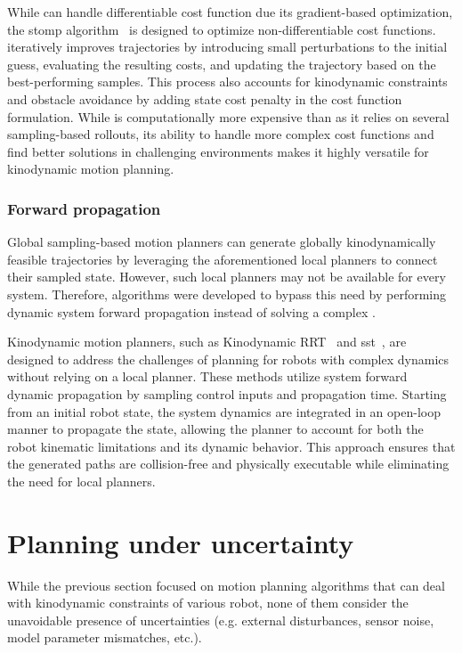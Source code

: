 While  can handle differentiable cost function due its gradient-based optimization, the \gls{stomp} algorithm~\cite{cSTOMP} is designed to optimize non-differentiable cost functions. 
 iteratively improves trajectories by introducing small perturbations to the initial guess, evaluating the resulting costs, and updating the trajectory based on the best-performing samples. 
This process also accounts for kinodynamic constraints and obstacle avoidance by adding state cost penalty in the cost function formulation.
While  is computationally more expensive than  as it relies on several sampling-based rollouts, its ability to handle more complex cost functions and find better solutions in challenging environments makes it highly versatile for kinodynamic motion planning.

\subsubsection{Forward propagation}\label{sec:forwardplanning}

Global sampling-based motion planners can generate globally kinodynamically feasible trajectories by leveraging the aforementioned local planners to connect their sampled state.
However, such local planners may not be available for every system.
Therefore, algorithms were developed to bypass this need by performing dynamic system forward propagation instead of solving a complex .

Kinodynamic motion planners, such as Kinodynamic RRT~\cite{cKinoRRT} and \gls{sst}~\cite{cSST}, are designed to address the challenges of planning for robots with complex dynamics without relying on a local planner. 
These methods utilize system forward dynamic propagation by sampling control inputs and propagation time. 
Starting from an initial robot state, the system dynamics are integrated in an open-loop manner to propagate the state, allowing the planner to account for both the robot kinematic limitations and its dynamic behavior. 
This approach ensures that the generated paths are collision-free and physically executable while eliminating the need for local planners.

\section{Planning under uncertainty}

While the previous section focused on motion planning algorithms that can deal with kinodynamic constraints of various robot, none of them consider the unavoidable presence of uncertainties (e.g. external disturbances, sensor noise, model parameter mismatches, etc.).

